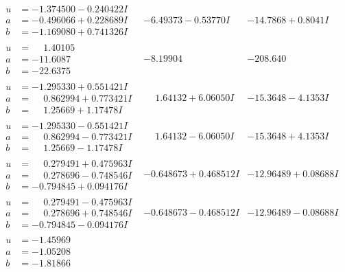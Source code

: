 \documentclass[1p]{elsarticle_modified}
\theoremstyle{definition}
\begin{document}
$$\begin{array}{c|c|c}
\begin{aligned}
u &= -1.374500 - 0.240422 I \\
a &= -0.496066 + 0.228689 I \\
b &= -1.169080 + 0.741326 I\end{aligned}
 & -6.49373 - 0.53770 I & -14.7868 + 0.8041 I \\ \hline\begin{aligned}
u &= \phantom{-}1.40105\phantom{ +0.000000I} \\
a &= -11.6087\phantom{ +0.000000I} \\
b &= -22.6375\phantom{ +0.000000I}\end{aligned}
 & -8.19904\phantom{ +0.000000I} & -208.640\phantom{ +0.000000I} \\ \hline\begin{aligned}
u &= -1.295330 + 0.551421 I \\
a &= \phantom{-}0.862994 + 0.773421 I \\
b &= \phantom{-}1.25669 + 1.17478 I\end{aligned}
 & \phantom{-}1.64132 + 6.06050 I & -15.3648 - 4.1353 I \\ \hline\begin{aligned}
u &= -1.295330 - 0.551421 I \\
a &= \phantom{-}0.862994 - 0.773421 I \\
b &= \phantom{-}1.25669 - 1.17478 I\end{aligned}
 & \phantom{-}1.64132 - 6.06050 I & -15.3648 + 4.1353 I \\ \hline\begin{aligned}
u &= \phantom{-}0.279491 + 0.475963 I \\
a &= \phantom{-}0.278696 - 0.748546 I \\
b &= -0.794845 + 0.094176 I\end{aligned}
 & -0.648673 + 0.468512 I & -12.96489 + 0.08688 I \\ \hline\begin{aligned}
u &= \phantom{-}0.279491 - 0.475963 I \\
a &= \phantom{-}0.278696 + 0.748546 I \\
b &= -0.794845 - 0.094176 I\end{aligned}
 & -0.648673 - 0.468512 I & -12.96489 - 0.08688 I \\ \hline\begin{aligned}
u &= -1.45969\phantom{ +0.000000I} \\
a &= -1.05208\phantom{ +0.000000I} \\
b &= -1.81866\phantom{ +0.000000I}\end{aligned}

\end{array}$$
\end{document}
